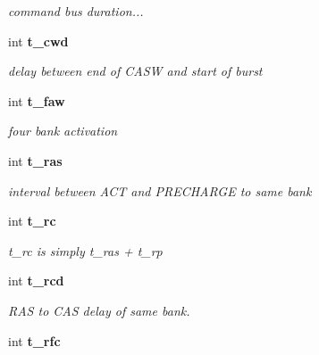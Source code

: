 \begin{DoxyCompactItemize}
\begin{DoxyCompactList}\small\item\em command bus duration... \item\end{DoxyCompactList}\item 
int {\bf t\_\-cwd}\label{class_d_r_a_msim_i_i_1_1_timing_specification_a68acd8ce7e2b5077eaebf184290e5a67}

\begin{DoxyCompactList}\small\item\em delay between end of CASW and start of burst \item\end{DoxyCompactList}\item 
int {\bf t\_\-faw}\label{class_d_r_a_msim_i_i_1_1_timing_specification_a8ee5adc74cf0f2301dc7869108eda169}

\begin{DoxyCompactList}\small\item\em four bank activation \item\end{DoxyCompactList}\item 
int {\bf t\_\-ras}\label{class_d_r_a_msim_i_i_1_1_timing_specification_af4f3f7f96d9be3b81092c999ababfb15}

\begin{DoxyCompactList}\small\item\em interval between ACT and PRECHARGE to same bank \item\end{DoxyCompactList}\item 
int {\bf t\_\-rc}\label{class_d_r_a_msim_i_i_1_1_timing_specification_a45ae656450362b03c7e5fe2357eb74f6}

\begin{DoxyCompactList}\small\item\em t\_\-rc is simply t\_\-ras + t\_\-rp \item\end{DoxyCompactList}\item 
int {\bf t\_\-rcd}\label{class_d_r_a_msim_i_i_1_1_timing_specification_a9cc88f875b6b3f6debf4d31eed6b2b9b}

\begin{DoxyCompactList}\small\item\em RAS to CAS delay of same bank. \item\end{DoxyCompactList}\item 
int {\bf t\_\-rfc}\label{class_d_r_a_msim_i_i_1_1_timing_specification_ad9e93a1deeadfa60147a93c8553e991d}


\end{DoxyCompactItemize}

